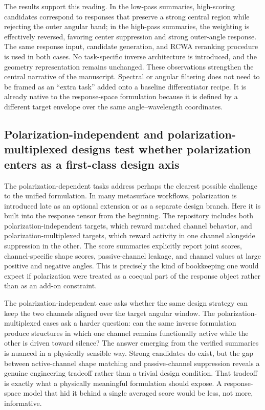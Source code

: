 The results support this reading. In the low-pass summaries, high-scoring candidates correspond to responses that preserve a strong central region while rejecting the outer angular band; in the high-pass summaries, the weighting is effectively reversed, favoring center suppression and strong outer-angle response. The same response input, candidate generation, and RCWA reranking procedure is used in both cases. No task-specific inverse architecture is introduced, and the geometry representation remains unchanged. These observations strengthen the central narrative of the manuscript. Spectral or angular filtering does not need to be framed as an ``extra task'' added onto a baseline differentiator recipe. It is already native to the response-space formulation because it is defined by a different target envelope over the same angle--wavelength coordinates.

\subsection{Polarization-independent and polarization-multiplexed designs test whether polarization enters as a first-class design axis}

The polarization-dependent tasks address perhaps the clearest possible challenge to the unified formulation. In many metasurface workflows, polarization is introduced late as an optional extension or as a separate design branch. Here it is built into the response tensor from the beginning. The repository includes both polarization-independent targets, which reward matched channel behavior, and polarization-multiplexed targets, which reward activity in one channel alongside suppression in the other. The score summaries explicitly report joint scores, channel-specific shape scores, passive-channel leakage, and channel values at large positive and negative angles. This is precisely the kind of bookkeeping one would expect if polarization were treated as a coequal part of the response object rather than as an add-on constraint.

The polarization-independent case asks whether the same design strategy can keep the two channels aligned over the target angular window. The polarization-multiplexed cases ask a harder question: can the same inverse formulation produce structures in which one channel remains functionally active while the other is driven toward silence? The answer emerging from the verified summaries is nuanced in a physically sensible way. Strong candidates do exist, but the gap between active-channel shape matching and passive-channel suppression reveals a genuine engineering tradeoff rather than a trivial design condition. That tradeoff is exactly what a physically meaningful formulation should expose. A response-space model that hid it behind a single averaged score would be less, not more, informative.

